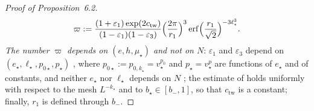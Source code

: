 \documentclass[11pt,letterpaper,reqno]{amsart}
\theoremstyle{definition}
\begin{document}
\begin{proof}[Proof of Proposition~6.2]
\begin{equation*}
\varpi:=\frac{(1+\varepsilon_1)\exp(2c_{\mathrm{tw}})}{(1-\varepsilon_1)(1-\varepsilon_3)}\Bigl(\frac{2\pi}{r_1}\Bigr)^3\operatorname{erf}\Bigl(\frac{r_1}{\sqrt2}\Bigr)^{-3\ell_\star^3}.
\end{equation*}
\emph{The number $\varpi$ depends on $(e,h,\mu_\star)$ and not on $N$}:
$\varepsilon_1$ and $\varepsilon_3$ depend on $(e_\star,\ell_\star,p_{0\star},p_\star)$ \cite[Section~G4.0.3]{QEDIII}, where $p_{0\star}:=p_{0,k_\star}=v_\star^{p_0}$ and $p_\star=v_\star^{p}$ are functions of $e_\star$ and of constants, and neither $e_\star$ nor $\ell_\star$ depends on $N$ \cite[Section~G4.0.2, (Sc1)]{QEDIII};
the estimate of \cite[Proposition~30.3\,(e)]{QEDIII} holds uniformly with respect to the mesh $L^{-k_\star}$ and to $b_\star\in[b_-,1]$, so that $c_{\mathrm{tw}}$ is a constant;
finally, $r_1$ is defined through $b_-$.


\end{proof}
\end{document}
